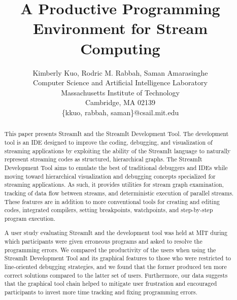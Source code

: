 \documentclass[times, 10pt,twocolumn]{article}
\begin{document}
\title {\bf A Productive Programming Environment for Stream Computing}

\author{
  Kimberly Kuo, Rodric M. Rabbah, Saman Amarasinghe\\
  Computer Science and Artificial Intelligence Laboratory\\
  Massachusetts Institute of Technology\\
  Cambridge, MA 02139\\
  \{kkuo, rabbah, saman\}@csail.mit.edu
}

\maketitle
\thispagestyle{empty}

\begin{abstract}
This paper  presents StreamIt and  the StreamIt Development  Tool. The
development tool is an IDE  designed to improve the coding, debugging,
and visualization of streaming  applications by exploiting the ability
of  the StreamIt language  to naturally  represent streaming  codes as
structured, hierarchical  graphs.  The StreamIt  Development Tool aims
to emulate  the best  of traditional debuggers  and IDEs  while moving
toward hierarchical  visualization and debugging  concepts specialized
for streaming applications.  As such, it provides utilities for stream
graph  examination,  tracking  of   data  flow  between  streams,  and
deterministic  execution of  parallel streams.  These features  are in
addition to  more conventional tools  for creating and  editing codes,
integrated   compilers,    setting   breakpoints,   watchpoints,   and
step-by-step program execution.

A user study evaluating StreamIt  and the development tool was held at
MIT during which participants  were given erroneous programs and asked
to resolve  the programming errors.   We compared the  productivity of
the users when  using the StreamIt Development Tool  and its graphical
features  to  those who  were  restricted  to line-oriented  debugging
strategies, and  we found  that the former  produced ten  more correct
solutions compared to  the latter set of users.  Furthermore, our data
suggests  that  the  graphical  tool  chain helped  to  mitigate  user
frustration and  encouraged participants to invest  more time tracking
and fixing programming errors.
\end{abstract}

\end{document}
